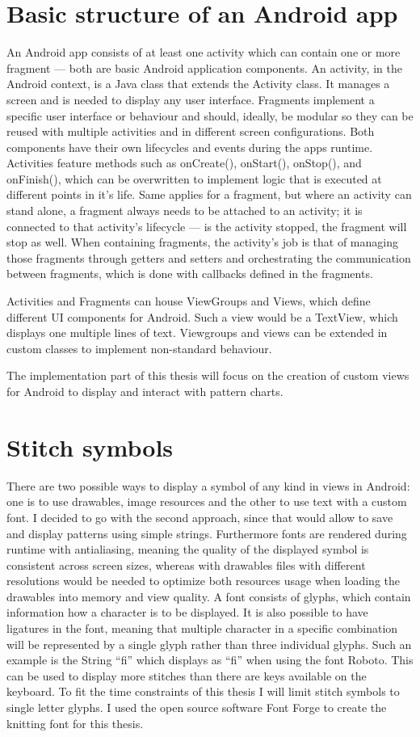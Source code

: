 \documentclass[a4paper,11pt]{kth-mag}
\begin{document}
\section{Basic structure of an Android app}
An Android app consists of at least one activity which can contain one or more fragment --- both are basic Android application components. An activity, in the Android context, is a Java class that extends the Activity class. It manages a screen and is needed to display any user interface. Fragments implement a specific user interface or behaviour and should, ideally, be modular so they can be reused with multiple activities and in different screen configurations. Both components have their own lifecycles and events during the apps runtime. Activities feature methods such as onCreate(), onStart(), onStop(), and onFinish(), which can be overwritten to implement logic that is executed at different points in it’s life. Same applies for a fragment, but where an activity can stand alone, a fragment always needs to be attached to an activity; it is connected to that activity's lifecycle --- is the activity stopped, the fragment will stop as well.
When containing fragments, the activity’s job is that of managing those fragments through getters and setters and orchestrating the communication between fragments, which is done with callbacks defined in the fragments.

Activities and Fragments can house ViewGroups and Views, which define different UI components for Android. Such a view would be a TextView, which displays one multiple lines of text. Viewgroups and views can be extended in custom classes to implement non-standard behaviour.

The implementation part of this thesis will focus on the creation of custom views for Android to display and interact with pattern charts.

\section{Stitch symbols}
There are two possible ways to display a symbol of any kind in views in Android: one is to use drawables, image resources and the other to use text with a custom font. I decided to go with the second approach, since that would allow to save and display patterns using simple strings. Furthermore fonts are rendered during runtime with antialiasing, meaning the quality of the displayed symbol is consistent across screen sizes, whereas with drawables files with different resolutions would be needed to optimize both resources usage when loading the drawables into memory and view quality.
A font consists of glyphs, which contain information how a character is to be displayed. It is also possible to have ligatures in the font, meaning that multiple character in a specific combination will be represented by a single glyph rather than three individual glyphs. Such an example is the String “fi” which displays as “fi” when using the font Roboto. This can be used to display more stitches than there are keys available on the keyboard. To fit the time constraints of this thesis I will limit stitch symbols to single letter glyphs.
I used the open source software Font Forge to create the knitting font for this thesis.
\end{document}
